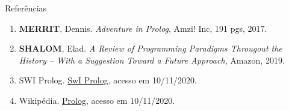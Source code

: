 \begin{frame}[fragile]{Referências}

    \begin{enumerate}
        \item \textbf{MERRIT}, Dennis. \textit{Adventure in Prolog}, Amzi! Inc, 191 pgs,
            2017.

        \item \textbf{SHALOM}, Elad. \textit{A Review of Programming Paradigms Througout the 
            History -- With a Suggestion Toward a Future Approach}, Amazon, 2019.

        \item SWI Prolog. \href{https://www.swi-prolog.org/}{SwI Prolog}, acesso em 
            10/11/2020.
 
        \item Wikipédia. \href{https://en.wikipedia.org/wiki/Prolog}{Prolog}, acesso em
            10/11/2020. 
    \end{enumerate}

\end{frame}
